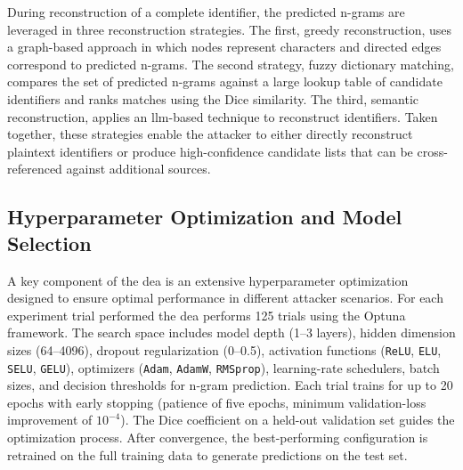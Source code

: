 \documentclass[a4paper,11pt]{scrartcl}
\begin{document}
During reconstruction of a complete identifier, the predicted n-grams are leveraged in three reconstruction strategies. 
The first, greedy reconstruction, uses a graph-based approach in which nodes represent characters and directed edges correspond to predicted n-grams.
The second strategy, fuzzy dictionary matching, compares the set of predicted n-grams against a large lookup table of candidate identifiers and ranks matches using the Dice similarity. 
The third, semantic reconstruction, applies an \ac{llm}-based technique to reconstruct identifiers. 
Taken together, these strategies enable the attacker to either directly reconstruct plaintext identifiers or produce high-confidence candidate lists that can be cross-referenced against additional sources.

\subsection{Hyperparameter Optimization and Model Selection}
A key component of the \ac{dea} is an extensive hyperparameter optimization designed to ensure optimal performance in different attacker scenarios. 
For each experiment trial performed the \ac{dea} performs 125 trials using the Optuna framework. 
The search space includes model depth (1–3 layers), hidden dimension sizes (64–4096), dropout regularization (0–0.5), activation functions (\texttt{ReLU}, \texttt{ELU}, \texttt{SELU}, \texttt{GELU}), optimizers (\texttt{Adam}, \texttt{AdamW}, \texttt{RMSprop}), learning-rate schedulers, batch sizes, and decision thresholds for n-gram prediction. 
Each trial trains for up to 20 epochs with early stopping (patience of five epochs, minimum validation-loss improvement of $10^{-4}$). 
The Dice coefficient on a held-out validation set guides the optimization process. 
After convergence, the best-performing configuration is retrained on the full training data to generate predictions on the test set.
\end{document}
